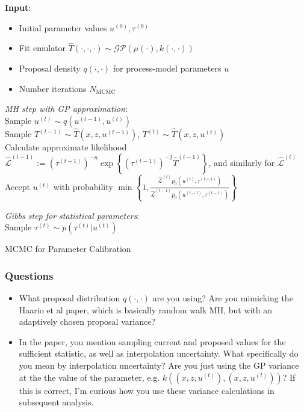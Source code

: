 \documentclass[12pt]{article}
\begin{document}
 \begin{algorithm}[H]
	\SetAlgoLined
	
	\textbf{Input}: 
	\begin{itemize}
	\item Initial parameter values $u^{(0)}, \tau^{(0)}$
	\item Fit emulator $\hat{T}(\cdot, \cdot, \cdot) \sim \mathcal{GP}(\mu(\cdot), k(\cdot, \cdot))$
	\item Proposal density $q(\cdot, \cdot)$ for process-model parameters $u$ 
	\item Number iterations $N_{\text{MCMC}}$
	\end{itemize}
		
	\bigskip
	
	 {
	\textit{MH step with GP approximation}: \\[.2cm]
	Sample $u^{(t)} \sim q(u^{(t - 1)}, u^{(t)})$ \\
	Sample $T^{(t - 1)} \sim \hat{T}(x, z, u^{(t - 1)})$, $T^{(t)} \sim \hat{T}(x, z, u^{(t)})$ \\
	Calculate approximate likelihood $\hat{\mathcal{L}}^{(t - 1)} := \left(\tau^{(t - 1)}\right)^{-n} \exp\left\{\left(\tau^{(t - 1)}\right)^{-2} \hat{T}^{(t - 1)}\right\}$, and similarly for $\hat{\mathcal{L}}^{(t)} $  \\
	Accept $u^{(t)}$ with probability $\min\left\{1, \frac{\hat{\mathcal{L}}^{(t)}p_0(u^{(t)}, \tau^{(t - 1)})}{\hat{\mathcal{L}}^{(t - 1)} p_0(u^{(t - 1)}, \tau^{(t - 1)})}\right\}$
	
	\bigskip
	
	\textit{Gibbs step for statistical parameters}: \\[.2cm]
	Sample $\tau^{(t)} \sim p(\tau^{(t)}|u^{(t)})$
	
	}

	
\caption{MCMC for Parameter Calibration}
\end{algorithm}


\subsubsection{Questions}
\begin{itemize}
\item What proposal distribution $q(\cdot, \cdot)$ are you using? Are you mimicking the Haario et al paper, which is basically random walk MH, but with an adaptively chosen proposal variance?
\item In the paper, you mention sampling current and proposed values for the sufficient statistic, as well as interpolation uncertainty. What specifically do you mean by interpolation uncertainty? Are 
you just using the GP variance at the the value of the parameter, e.g. $k((x, z, u^{(t)}), (x, z, u^{(t)}))$? If this is correct, I'm curious how you use these variance calculations in subsequent analysis. 
\end{itemize}
\end{document}
